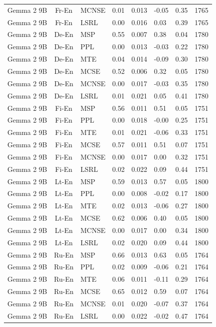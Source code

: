\begin{table}
\begin{tabular}{lc}
Gemma 2 9B & Fr-En & MCNSE & 0.01 & 0.013 & -0.05 & 0.35 & 1765 \\
Gemma 2 9B & Fr-En & LSRL & 0.00 & 0.016 & 0.03 & 0.39 & 1765 \\
Gemma 2 9B & De-En & MSP & 0.55 & 0.007 & 0.38 & 0.04 & 1780 \\
Gemma 2 9B & De-En & PPL & 0.00 & 0.013 & -0.03 & 0.22 & 1780 \\
Gemma 2 9B & De-En & MTE & 0.04 & 0.014 & -0.09 & 0.30 & 1780 \\
Gemma 2 9B & De-En & MCSE & 0.52 & 0.006 & 0.32 & 0.05 & 1780 \\
Gemma 2 9B & De-En & MCNSE & 0.00 & 0.017 & -0.03 & 0.35 & 1780 \\
Gemma 2 9B & De-En & LSRL & 0.01 & 0.021 & 0.05 & 0.41 & 1780 \\
Gemma 2 9B & Fi-En & MSP & 0.56 & 0.011 & 0.51 & 0.05 & 1751 \\
Gemma 2 9B & Fi-En & PPL & 0.00 & 0.018 & -0.00 & 0.25 & 1751 \\
Gemma 2 9B & Fi-En & MTE & 0.01 & 0.021 & -0.06 & 0.33 & 1751 \\
Gemma 2 9B & Fi-En & MCSE & 0.57 & 0.011 & 0.51 & 0.07 & 1751 \\
Gemma 2 9B & Fi-En & MCNSE & 0.00 & 0.017 & 0.00 & 0.32 & 1751 \\
Gemma 2 9B & Fi-En & LSRL & 0.02 & 0.022 & 0.09 & 0.44 & 1751 \\
Gemma 2 9B & Lt-En & MSP & 0.59 & 0.013 & 0.57 & 0.05 & 1800 \\
Gemma 2 9B & Lt-En & PPL & 0.00 & 0.008 & -0.02 & 0.17 & 1800 \\
Gemma 2 9B & Lt-En & MTE & 0.02 & 0.013 & -0.06 & 0.27 & 1800 \\
Gemma 2 9B & Lt-En & MCSE & 0.62 & 0.006 & 0.40 & 0.05 & 1800 \\
Gemma 2 9B & Lt-En & MCNSE & 0.00 & 0.017 & 0.00 & 0.34 & 1800 \\
Gemma 2 9B & Lt-En & LSRL & 0.02 & 0.020 & 0.09 & 0.44 & 1800 \\
Gemma 2 9B & Ru-En & MSP & 0.66 & 0.013 & 0.63 & 0.05 & 1764 \\
Gemma 2 9B & Ru-En & PPL & 0.02 & 0.009 & -0.06 & 0.21 & 1764 \\
Gemma 2 9B & Ru-En & MTE & 0.06 & 0.011 & -0.11 & 0.29 & 1764 \\
Gemma 2 9B & Ru-En & MCSE & 0.65 & 0.012 & 0.59 & 0.07 & 1764 \\
Gemma 2 9B & Ru-En & MCNSE & 0.01 & 0.020 & -0.07 & 0.37 & 1764 \\
Gemma 2 9B & Ru-En & LSRL & 0.00 & 0.022 & -0.02 & 0.47 & 1764 \\
\midrule
\end{tabular}
\end{table}
